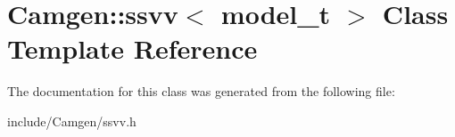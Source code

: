 \hypertarget{a00505}{\section{Camgen\-:\-:ssvv$<$ model\-\_\-t $>$ Class Template Reference}
\label{a00505}
}


The documentation for this class was generated from the following file\-:\begin{DoxyCompactItemize}
\item 
include/\-Camgen/ssvv.\-h\end{DoxyCompactItemize}
